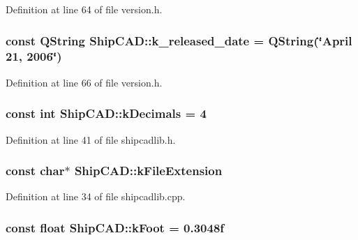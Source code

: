 Definition at line 64 of file version.\-h.

\hypertarget{namespaceShipCAD_a833fc6d39d2f0fd7fa31d0a691b0b726}{
\subsubsection[{k\-\_\-released\-\_\-date}]{\setlength{\rightskip}{0pt plus 5cm}const Q\-String Ship\-C\-A\-D\-::k\-\_\-released\-\_\-date = Q\-String(\char`\"{}April 21, 2006\char`\"{})}}\label{namespaceShipCAD_a833fc6d39d2f0fd7fa31d0a691b0b726}


Definition at line 66 of file version.\-h.

\hypertarget{namespaceShipCAD_ac88ffd27e117a3e612997a36a5d4616d}{
\subsubsection[{k\-Decimals}]{\setlength{\rightskip}{0pt plus 5cm}const int Ship\-C\-A\-D\-::k\-Decimals = 4}}\label{namespaceShipCAD_ac88ffd27e117a3e612997a36a5d4616d}


Definition at line 41 of file shipcadlib.\-h.

\hypertarget{namespaceShipCAD_a76ec58fc6d779982def49fface17b1a4}{
\subsubsection[{k\-File\-Extension}]{\setlength{\rightskip}{0pt plus 5cm}const char$\ast$ Ship\-C\-A\-D\-::k\-File\-Extension}}\label{namespaceShipCAD_a76ec58fc6d779982def49fface17b1a4}


Definition at line 34 of file shipcadlib.\-cpp.

\hypertarget{namespaceShipCAD_a8c1484188fed1e735c5a94f64a6817ab}{
\subsubsection[{k\-Foot}]{\setlength{\rightskip}{0pt plus 5cm}const float Ship\-C\-A\-D\-::k\-Foot = 0.\-3048f}}\label{namespaceShipCAD_a8c1484188fed1e735c5a94f64a6817ab}


